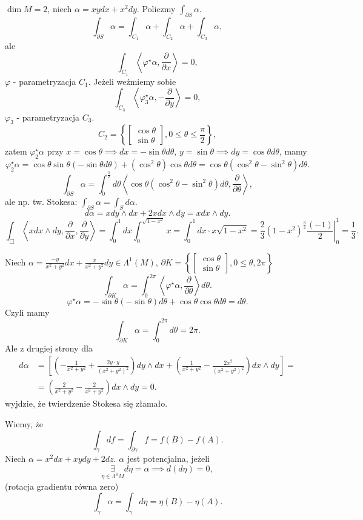 \documentclass[../main.tex]{subfiles}
\begin{document}
\begin{przyklad}
    $\dim M = 2$, niech $\alpha = xydx + x^2dy$. Policzmy $\int_{\partial S}\alpha$.
    \[
    \int_{\partial S}\alpha = \int_{C_1}\alpha + \int_{C_2}\alpha + \int_{C_3}\alpha
    ,\]
ale
    \[
        \int_{C_1}\left<\varphi^\star\alpha, \frac{\partial }{\partial x}  \right> = 0
    ,\]
$\varphi$ - parametryzacja $C_1$. Jeżeli weźmiemy sobie
\[
\int_{C_3}\left<\varphi_3^\star\alpha, - \frac{\partial }{\partial y}  \right> = 0
,\]
$\varphi_3$ - parametryzacja $C_3$.
\[
    C_2 = \left\{ \begin{bmatrix} \cos\theta\\ \sin\theta \end{bmatrix}, 0\le \theta \le \frac{\pi}{2}  \right\}
,\]
zatem $\varphi_2^\star\alpha$ przy $x = \cos\theta \implies dx = -\sin\theta d\theta$, $y = \sin\theta \implies dy = \cos\theta d\theta$, mamy
\[
    \varphi_2^\star \alpha = \cos\theta \sin\theta(-\sin\theta d\theta) + (\cos^2\theta)\cos\theta d\theta = \cos\theta(\cos^2\theta - \sin^2\theta)d\theta
.\]
\[
    \int_{\partial S}\alpha = \int_0^{\frac{\pi}{2}}d\theta \left<\cos\theta(\cos^2\theta - \sin^2\theta)d\theta, \frac{\partial }{\partial \theta}  \right>
,\]
ale np. tw. Stokesa: $\int_{\partial S}\alpha = \int_S d\alpha$.
\[
d\alpha = xdy\land dx + 2xdx\land dy = xdx\land dy
.\]
\[
    \int_{\Box}\left<xdx\land dy, \frac{\partial }{\partial x} , \frac{\partial }{\partial y}  \right> = \int_0^1dx\int_0^{\sqrt{1-x^2} } x = \int_0^1dx \cdot x\sqrt{1-x^2} = \left.\frac{2}{3}(1-x^2)^{\frac{3}{2}}\frac{(-1)}{2}\right|_0^1 = \frac{1}{3}
.\]
\end{przyklad}
\begin{przyklad}
    Niech $\alpha = \frac{-y}{x^2+y^2}dx + \frac{x}{x^2+y^2}dy\in \Lambda^1(M)$, $\partial K = \left\{ \begin{bmatrix} \cos\theta\\ \sin\theta \end{bmatrix} , 0\le \theta, 2\pi \right\} $
    \[
        \int_{\partial K}\alpha = \int_0^{2\pi}\left<\varphi^\star\alpha, \frac{\partial }{\partial \theta} \right>d\theta
    .\]
\[
    \varphi^\star \alpha = -\sin\theta(-\sin\theta)d\theta + \cos\theta\cos\theta d\theta = d\theta
.\]
Czyli mamy
\[
\int_{\partial K}\alpha = \int_0^{2\pi}d\theta = 2\pi
.\]
Ale z drugiej strony dla
    \begin{align*}
        d\alpha &= \left[ \left( -\frac{1}{x^2+y^2} + \frac{2y\cdot y}{(x^2+y^2)^2} \right) dy\land dx + \left( \frac{1}{x^2+y^2} - \frac{2x^2}{(x^2+y^2)^2} \right) dx\land dy \right] = \\
        &= \left( \frac{2}{x^2 + y^2} - \frac{2}{x^2+y^2} \right) dx\land dy = 0
    .\end{align*}
     wyjdzie, że twierdzenie Stokesa się złamało.
\end{przyklad}
Wiemy, że
\[
    \int_{\gamma}df = \int_{\partial\gamma}f = f(B) - f(A)
.\]
Niech $\alpha = x^2dx + xydy + 2dz$. $\alpha$ jest potencjalna, jeżeli
\[
    \underset{\eta\in \Lambda^0M}{\exists} d\eta = \alpha \implies d(d\eta) = 0
,\]
(rotacja gradientu równa zero)
\[
    \int_{\gamma}\alpha = \int_{\gamma}d\eta = \eta(B) - \eta(A)
.\]
\end{document}

